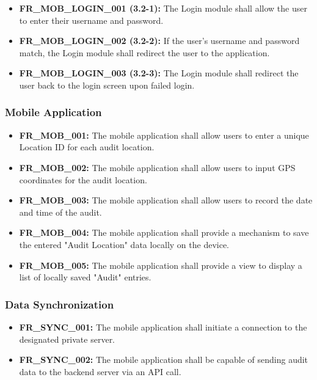 \documentclass[12pt]{article}
\begin{document}
\begin{itemize}
    \item \textbf{FR\_MOB\_LOGIN\_001 (3.2-1):} The Login module shall allow the user to enter their username and password.
    \item \textbf{FR\_MOB\_LOGIN\_002 (3.2-2):} If the user's username and password match, the Login module shall redirect the user to the application.
    \item \textbf{FR\_MOB\_LOGIN\_003 (3.2-3):} The Login module shall redirect the user back to the login screen upon failed login.
\end{itemize}

\subsubsection{Mobile Application}

\begin{itemize}
    \item \textbf{FR\_MOB\_001:} The mobile application shall allow users to enter a unique Location ID for each audit location.
    \item \textbf{FR\_MOB\_002:} The mobile application shall allow users to input GPS coordinates for the audit location.
    \item \textbf{FR\_MOB\_003:} The mobile application shall allow users to record the date and time of the audit.
    \item \textbf{FR\_MOB\_004:} The mobile application shall provide a mechanism to save the entered "Audit Location" data locally on the device.
    \item \textbf{FR\_MOB\_005:} The mobile application shall provide a view to display a list of locally saved "Audit" entries.
\end{itemize}

\subsubsection{Data Synchronization}

\begin{itemize}
    \item \textbf{FR\_SYNC\_001:} The mobile application shall initiate a connection to the designated private server.
    \item \textbf{FR\_SYNC\_002:} The mobile application shall be capable of sending audit data to the backend server via an API call.
\end{itemize}
\end{document}
